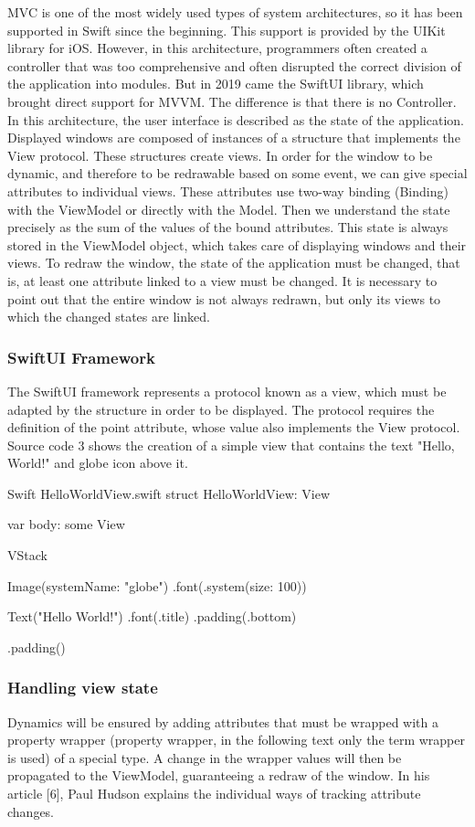 \documentclass[
  language=english,
  figures=false,
  sourcecodes,
  index
]{kidiplom}
\begin{document}
MVC is one of the most widely used types of system architectures, so it has been supported in Swift since the beginning. This support is provided by the UIKit library for iOS. However, in this architecture, programmers often created a controller that was too comprehensive and often disrupted the correct division of the application into modules. But in 2019 came the SwiftUI library, which brought direct support for MVVM. 
The difference is that there is no Controller. In this architecture, the user interface is described as the state of the application. Displayed windows are composed of instances of a structure that implements the View protocol. These structures create views. In order for the window to be dynamic, and therefore to be redrawable based on some event, we can give special attributes to individual views. These attributes use two-way binding (Binding) with the ViewModel or directly with the Model. Then we understand the state precisely as the sum of the values of the bound attributes. This state is always stored in the ViewModel object, which takes care of displaying windows and their views. To redraw the window, the state of the application must be changed, that is, at least one attribute linked to a view must be changed. It is necessary to point out that the entire window is not always redrawn, but only its views to which the changed states are linked.

\subsubsection{SwiftUI Framework}
The SwiftUI framework represents a protocol known as a view, which must be adapted by the structure in order to be displayed. The protocol requires the definition of the point attribute, whose value also implements the View protocol. Source code 3 shows the creation of a simple view that contains the text "Hello, World!" and globe icon above it.

\begin{kicode}{Swift}{} {HelloWorldView.swift}
struct HelloWorldView: View {
    var body: some View {
        VStack {
            Image(systemName: "globe")
                .font(.system(size: 100))
                
            Text("Hello World!")
                .font(.title)
                .padding(.bottom)
        }
        .padding()
    }
}
\end{kicode}

\subsubsection{Handling view state}
Dynamics will be ensured by adding attributes that must be wrapped with a property wrapper (property wrapper, in the following text only the term wrapper is used) of a special type. A change in the wrapper values will then be propagated to the ViewModel, guaranteeing a redraw of the window. In his article [6], Paul Hudson explains the individual ways of tracking attribute changes.
\end{document}
